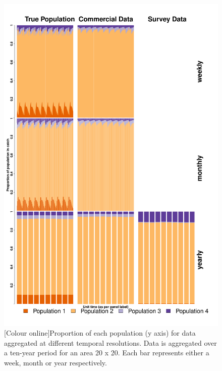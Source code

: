 \documentclass[preprint]{elsarticle}
\begin{document}
\begin{figure}[!ht]
	\includegraphics[width=\linewidth]{../analysis/Data_Aggregation_time_Rev3}
	\caption{[Colour online]Proportion of each population (y axis) for data
		aggregated at different temporal resolutions. Data is
		aggregated over a ten-year period for an area 20 x 20. Each bar
		represents either a week, month or year respectively.}
	\label{fig:2}
\end{figure}	
\end{document}
